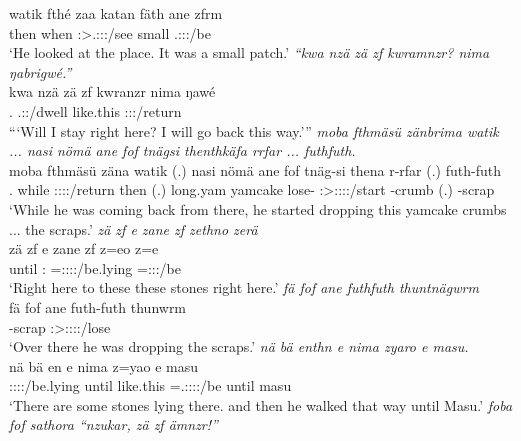 \begin{exe}
	\gll watik fthé zaa katan fäth ane zfrm\\ 
	then when \Sg:\Sbj>\Tsg.\F:\Obj:\Pst:\Pfv/see small \Dim{} \Dem{} \Tsg.\F:\Sbj:\Pst:\Dur/be\\
	\trans `He looked at the place. It was a small patch.'
	\emph{``kwa nzä zä zf kwramnzr? nima ŋabrigwé.''}\\
	\gll kwa nzä zä zf kwranzr nima ŋawé\\ 
	\Fut{} \Fsg.\Abs{} \Prox{} \Imm{} \Fsg.\Sbj:\Irr:\Ipfv/dwell like.this \Fsg:\Sbj:\Nonpast:\Ipfv/return\\
	\trans ```Will I stay right here? I will go back this way.'''
	\emph{moba fthmäsü zänbrima watik ... nasi nömä ane fof tnägsi thenthkäfa rrfar ... futhfuth.}\\
	\gll moba fthmäsü zäna watik (.) nasi nömä ane fof tnäg-si thena r-rfar (.) futh-futh\\ 
	\Med.\Abl{} while \Sg:\Sbj:\Pst:\Pfv:\Venit/return then (.) long.yam yamcake \Dem{} \Emph{} lose-\Nmlz{} \Sg:\Sbj>\Stpl:\Obj:\Pst:\Pfv:\Venit/start \Redup-crumb (.) \Redup-scrap\\
	\trans `While he was coming back from there, he started dropping this yamcake crumbs ... the scraps.'
	\emph{zä zf e zane zf zethno zerä}\\
	\gll zä zf e zane zf z=eo z=e\\ 
	\Prox{} \Imm{} until \Dem:\Prox{} \Imm{} \Prox=\Stpl:\Sbj:\Nonpast:\Stat:\Andat/be.lying \Prox=\Stpl:\Sbj:\Nonpast:\Ipfv/be\\
	\trans `Right here to these these stones right here.'
	\emph{fä fof ane futhfuth thuntnägwrm}\\
	\gll fä fof ane futh-futh thunwrm\\ 
	\Dist{} \Emph{} \Dem{} \Redup-scrap \Sg:\Sbj>\Stpl:\Obj:\Pst:\Dur:\Venit/lose\\
	\trans `Over there he was dropping the scraps.'
	\emph{nä bä enthn e nima zyaro e masu.}\\
	\gll nä bä en e nima z=yao e masu\\ 
	\Indf{} \Med{} \Stpl:\Sbj:\Nonpast:\Stat:\Venit/be.lying until like.this \Prox=\Tsg.\Masc:\Sbj:\Pst:\Ipfv:\Andat/be until masu\\
	\trans `There are some stones lying there. and then he walked that way until Masu.'
	\emph{foba fof sathora ``nzukar, zä zf ämnzr!''}\\

\end{exe}
